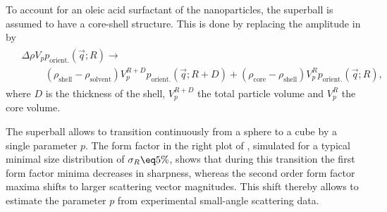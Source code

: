 \documentclass[\main/dresen_thesis.tex]{subfiles}
\begin{document}
    To account for an oleic acid surfactant of the nanoparticles, the superball is assumed to have a core-shell structure.
    This is done by replacing the amplitude in  by
    \begin{align}
      \begin{split}
        &\Delta \rho V_p p_\mathrm{orient.}(\vec{q}; R) \rightarrow\\
        &\hspace{1cm}(\rho_\mathrm{shell} - \rho_\mathrm{solvent}) V_p^{R+D} p_\mathrm{orient.}(\vec{q}; R+D) + (\rho_\mathrm{core} - \rho_\mathrm{shell}) V_p^{R} p_\mathrm{orient.}(\vec{q}; R),
      \end{split}
    \end{align}
    where $D$ is the thickness of the shell, $V_p^{R+D}$ the total particle volume and $V_p^{R}$ the core volume.

    The superball allows to transition continuously from a sphere to a cube by a single parameter $p$.
    The form factor in the right plot of , simulated for a typical minimal size distribution of $\sigma_R \eq 5 \%$, shows that during this transition the first form factor minima decreases in sharpness, whereas the second order form factor maxima shifts to larger scattering vector magnitudes.
    This shift thereby allows to estimate the parameter $p$ from experimental small-angle scattering data.
\end{document}
